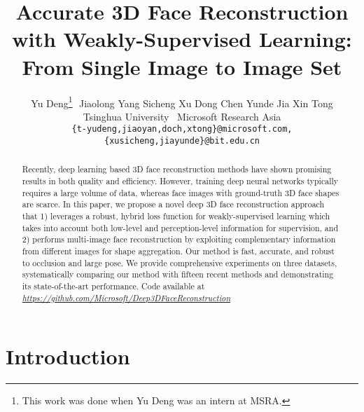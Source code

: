\documentclass[10pt,twocolumn,letterpaper]{article}
\begin{document}
	
\title{
	\vspace{-6pt}
	Accurate 3D Face Reconstruction with Weakly-Supervised Learning:\\ From Single Image to Image Set\\
	\vspace{-4pt}
}
\author{
Yu Deng\thanks{This work was done when Yu Deng was an intern at MSRA.}\,\, \quad Jiaolong Yang \quad Sicheng Xu \quad Dong Chen \quad Yunde Jia \quad Xin Tong \\
{Tsinghua University} \quad  {Microsoft Research Asia} \\

{\tt\small \{t-yudeng,jiaoyan,doch,xtong\}@microsoft.com, \{xusicheng,jiayunde\}@bit.edu.cn}

}

\maketitle



\begin{abstract}
	Recently, deep learning based 3D face reconstruction methods have shown promising results in both quality and efficiency.
	However, training deep neural networks typically requires a large volume of data, whereas face images with ground-truth 3D face shapes are scarce. 
	In this paper, we propose a novel deep 3D face reconstruction approach that 1) leverages a robust, hybrid loss function for weakly-supervised learning which takes into account both low-level and perception-level information for supervision, and 2) performs multi-image face reconstruction by exploiting complementary information from different images for shape aggregation. Our method is fast, accurate, and robust to occlusion and large pose. We provide comprehensive experiments on three datasets, systematically comparing our method with fifteen recent methods and demonstrating its state-of-the-art performance. Code available at  \emph{\url{https://github.com/Microsoft/Deep3DFaceReconstruction}}
\end{abstract}

\section{Introduction}
\end{document}
